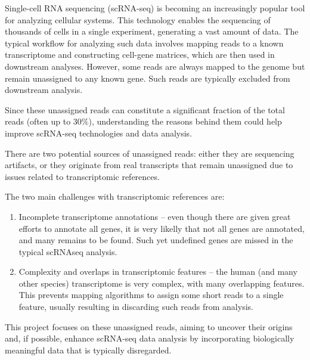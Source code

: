 Single-cell RNA sequencing (scRNA-seq) is becoming an increasingly popular tool for analyzing cellular systems.
This technology enables the sequencing of thousands of cells in a single experiment, generating a vast amount of data.
The typical workflow for analyzing such data involves mapping reads to a known transcriptome and constructing cell-gene matrices,
which are then used in downstream analyses.
However, some reads are always mapped to the genome but remain unassigned to any known gene.
Such reads are typically excluded from downstream analysis.

Since these unassigned reads can constitute a significant fraction of the total reads (often up to 30\%),
understanding the reasons behind them could help improve scRNA-seq technologies and data analysis.

There are two potential sources of unassigned reads: either they are sequencing artifacts,
or they originate from real transcripts that remain unassigned due to issues related to transcriptomic references.

The two main challenges with transcriptomic references are:

\begin{enumerate}
  \item Incomplete transcriptome annotations –
  even though there are given great efforts to annotate all genes, it is very likelly that not all genes are annotated,
  and many remains to be found.
  Such yet undefined genes are missed in the typical scRNAseq analysis.
  \item Complexity and overlaps in transcriptomic features – the human (and many other species) transcriptome is very complex,
   with many overlapping features.
  This prevents mapping algorithms to assign some short reads to a single feature, usually resulting in discarding such reads from analysis.
\end{enumerate}

This project focuses on these unassigned reads, aiming to uncover their origins and, if possible,
enhance scRNA-seq data analysis by incorporating biologically meaningful data that is typically disregarded.
